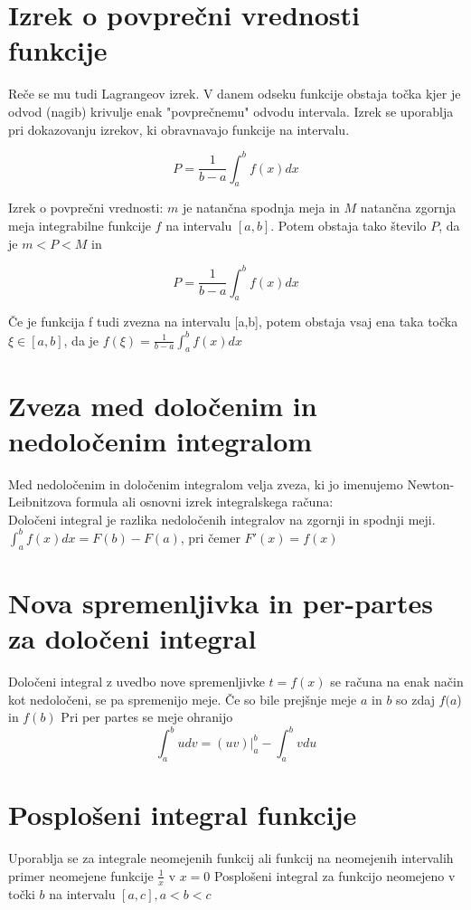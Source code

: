 \documentclass[12pt]{report}
\begin{document}
\section*{Izrek o povprečni vrednosti funkcije}
Reče se mu tudi Lagrangeov izrek. V danem odseku funkcije obstaja točka kjer je odvod (nagib) krivulje enak "povprečnemu" odvodu intervala. Izrek se uporablja pri dokazovanju izrekov, ki obravnavajo funkcije na intervalu. 

\[P=\frac{1}{b-a}\int_a^bf(x)dx\]

Izrek o povprečni vrednosti: $m$ je natančna spodnja meja in $M$ natančna zgornja meja integrabilne funkcije $f$ na intervalu $[a,b]$. Potem obstaja tako število $P$, da je $ m< P < M$ in 

\[P=\frac{1}{b-a}\int_a^bf(x)dx\]

Če je funkcija f tudi zvezna na intervalu [a,b], potem obstaja vsaj ena taka točka $\xi \in [a,b]$, da je $f(\xi)=\frac{1}{b-a}\int_a^bf(x)dx$

\section*{Zveza med določenim in nedoločenim integralom}

Med nedoločenim in določenim integralom velja zveza, ki jo imenujemo Newton-Leibnitzova formula ali osnovni izrek integralskega računa:	\\
Določeni integral je razlika nedoločenih integralov na zgornji in spodnji meji. $\int_a^bf(x)dx=F(b)-F(a)$, pri čemer $F'(x)=f(x)$

\section*{Nova spremenljivka in per-partes za določeni integral}
Določeni integral z uvedbo nove spremenljivke $t=f(x)$ se računa na enak način kot nedoločeni, se pa spremenijo meje. Če so bile prejšnje meje $a$ in $b$ so zdaj $f(a$) in $f(b)$
Pri per partes se meje ohranijo
\[\int_a^budv=(uv)|_a^b-\int_a^bvdu\]
 

\section*{Posplošeni integral funkcije}
Uporablja se za integrale neomejenih funkcij ali funkcij na neomejenih intervalih
primer neomejene funkcije $\frac{1}{x}$ v $x=0$
Posplošeni integral za funkcijo neomejeno v točki $b$ na intervalu $[a,c], a<b<c$
 
\end{document}
